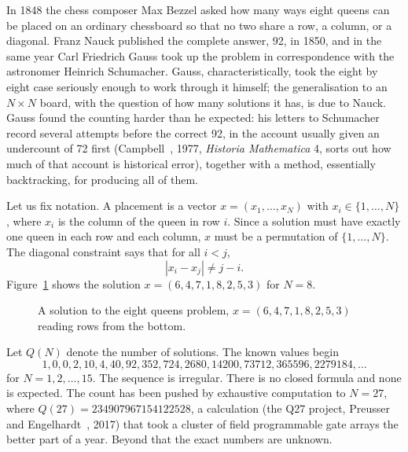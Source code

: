 \documentclass[11pt,twoside,openany]{book}
\theoremstyle{plain}
\theoremstyle{definition}
\theoremstyle{remark}
\begin{document}
In 1848 the chess composer Max Bezzel asked how many ways eight queens can be placed on an ordinary chessboard so that no two share a row, a column, or a diagonal. Franz Nauck published the complete answer, 92, in 1850, and in the same year Carl Friedrich Gauss took up the problem in correspondence with the astronomer Heinrich Schumacher. Gauss, characteristically, took the eight by eight case seriously enough to work through it himself; the generalisation to an $N \times N$ board, with the question of how many solutions it has, is due to Nauck. Gauss found the counting harder than he expected: his letters to Schumacher record several attempts before the correct 92, in the account usually given an undercount of 72 first (Campbell~\cite{Campbell}, 1977, \emph{Historia Mathematica} 4, sorts out how much of that account is historical error), together with a method, essentially backtracking, for producing all of them.

Let us fix notation. A placement is a vector $x = (x_1, \dots, x_N)$ with $x_i \in \{1, \dots, N\}$, where $x_i$ is the column of the queen in row $i$. Since a solution must have exactly one queen in each row and each column, $x$ must be a permutation of $\{1, \dots, N\}$. The diagonal constraint says that for all $i < j$,
\[
|x_i - x_j| \neq j - i .
\]
Figure~\ref{fig:board} shows the solution $x = (6, 4, 7, 1, 8, 2, 5, 3)$ for $N = 8$.

\begin{figure}[t]
\centering
{}
\caption{A solution to the eight queens problem, $x = (6,4,7,1,8,2,5,3)$ reading rows from the bottom.}
\label{fig:board}
\end{figure}

Let $Q(N)$ denote the number of solutions. The known values begin
\[
1, 0, 0, 2, 10, 4, 40, 92, 352, 724, 2680, 14200, 73712, 365596, 2279184, \dots
\]
for $N = 1, 2, \dots, 15$. The sequence is irregular. There is no closed formula and none is expected. The count has been pushed by exhaustive computation to $N = 27$, where $Q(27) = 234907967154122528$, a calculation (the Q27 project, Preusser and Engelhardt~\cite{PreusserEngelhardt}, 2017) that took a cluster of field programmable gate arrays the better part of a year. Beyond that the exact numbers are unknown.
\end{document}
